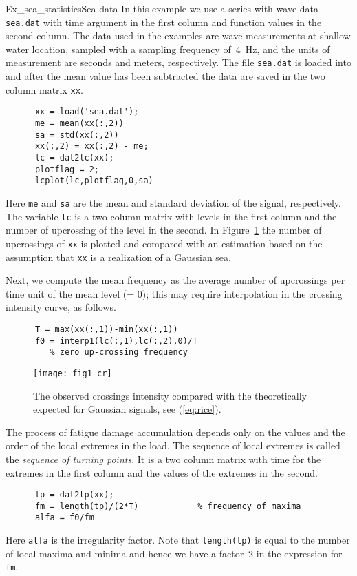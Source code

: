 \begin{rtex}{Ex_sea_statistics}{Sea data}\label{pageseadat}
In this example we use a series with wave data {\tt sea.dat}
with time argument in the first column and function values in
the second column. The data used in the examples are wave measurements
at shallow water location, sampled with a sampling frequency
of~4~Hz, and the units of measurement are seconds and meters, respectively.
The file {\tt sea.dat} is loaded into \ML{} and after the mean
value has been subtracted the data are saved in the two column matrix
{\tt xx}.
{\small\begin{verbatim}
      xx = load('sea.dat');
      me = mean(xx(:,2))
      sa = std(xx(:,2))
      xx(:,2) = xx(:,2) - me;
      lc = dat2lc(xx);
      plotflag = 2;
      lcplot(lc,plotflag,0,sa)
\end{verbatim}}
Here {\tt me} and {\tt sa} are the mean and standard deviation of the signal,
respectively. The variable {\tt lc} is a two column matrix with
levels in the first column and the number of upcrossing of the level in
the second. In Figure~\ref{fig1_cr} the number of upcrossings of
{\tt xx} is plotted and compared with an estimation based on the
assumption that {\tt xx} is a realization of a Gaussian sea.

Next, we compute the mean frequency as the average number of upcrossings
per time unit of the mean level (= 0); this may require interpolation in the
crossing intensity curve, as follows.
{\small\begin{verbatim}
      T = max(xx(:,1))-min(xx(:,1))
      f0 = interp1(lc(:,1),lc(:,2),0)/T
         % zero up-crossing frequency
\end{verbatim}}

\begin{figure}[tbh]
\centering
\texttt{[image: fig1\_cr]}
\vspace{-3mm}
\caption[Example of crossing spectrum]{
The observed crossings intensity compared with the theoretically expected for
Gaussian signals, see (\ref{eq:rice}).}
\label{fig1_cr}
\end{figure}
The process of fatigue damage accumulation depends only on the values
and the order of the local extremes in the load. The sequence of local
extremes is called the \emph{sequence of turning points}.
 It is a two
column matrix with time for the extremes in the first column and the
values of the extremes in the second.
{\small\begin{verbatim}
      tp = dat2tp(xx);
      fm = length(tp)/(2*T)            % frequency of maxima
      alfa = f0/fm
\end{verbatim}}

Here {\tt alfa} is the irregularity factor. Note that {\tt length(tp)} is
equal to the number of local maxima and minima and hence we have a
factor~2 in the expression for {\tt fm}.
\end{rtex}

